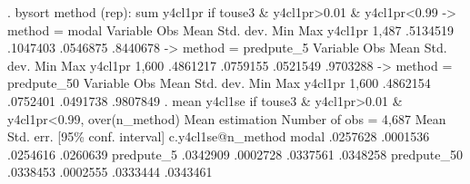 . bysort method (rep): sum y4cl1pr if touse3 \& y4cl1pr>0.01 \& y4cl1pr<0.99
{\smallskip}
-> method = modal
{\smallskip}
    Variable {\VBAR}        Obs        Mean    Std. dev.       Min        Max
     y4cl1pr {\VBAR}      1,487    .5134519    .1047403   .0546875   .8440678
{\smallskip}
-> method = predpute_5
{\smallskip}
    Variable {\VBAR}        Obs        Mean    Std. dev.       Min        Max
     y4cl1pr {\VBAR}      1,600    .4861217    .0759155   .0521549   .9703288
{\smallskip}
-> method = predpute_50
{\smallskip}
    Variable {\VBAR}        Obs        Mean    Std. dev.       Min        Max
     y4cl1pr {\VBAR}      1,600    .4862154    .0752401   .0491738   .9807849
{\smallskip}
{\smallskip}
. mean y4cl1se if touse3 \& y4cl1pr>0.01 \& y4cl1pr<0.99, over(n_method)
{\smallskip}
Mean estimation                                Number of obs = 4,687
{\smallskip}
                   {\VBAR}       Mean   Std. err.     [95\% conf. interval]
c.y4cl1se@n_method {\VBAR}
            modal  {\VBAR}   .0257628   .0001536      .0254616    .0260639
       predpute_5  {\VBAR}   .0342909   .0002728      .0337561    .0348258
      predpute_50  {\VBAR}   .0338453   .0002555      .0333444    .0343461
